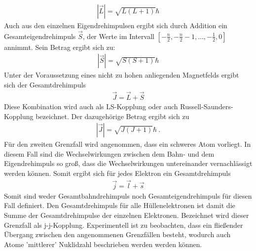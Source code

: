 \begin{align}
	|\vec{L}|=\sqrt{L(L+1)}\hbar
\end{align} 
Auch aus den einzelnen Eigendrehimpulsen ergibt sich durch Addition ein Gesamteigendrehimpuls $\vec{S}$, der Werte im Intervall $[-\frac{n}{2},-\frac{n}{2}-1,...,-\frac{1}{2},0]$ annimmt. Sein Betrag ergibt sich zu:
\begin{align}
	|\vec{S}|=\sqrt{S(S+1)}\hbar
\end{align} 
Unter der Voraussetzung eines nicht zu hohen anliegenden Magnetfelds ergibt sich der Gesamtdrehimpuls 
\begin{align}
	\vec{J}=\vec{L}+\vec{S}
\end{align}
Diese Kombination wird auch als LS-Kopplung oder auch Russell-Saunders-Kopplung bezeichnet.
Der dazugehörige Betrag ergibt sich zu
\begin{align}
	|\vec{J}|=\sqrt{J(J+1)}\hbar\:.
\end{align} 
Für den zweiten Grenzfall wird angenommen, dass ein schweres Atom vorliegt. In diesem Fall sind die Wechselwirkungen zwischen dem Bahn- und dem Eigendrehimpuls so groß, dass die Wechselwirkungen untereinander vernachlässigt werden können. Somit ergibt sich für jedes Elektron ein Gesamtdrehimpuls
\begin{align}
	\vec{j}=\vec{l}+\vec{s}
\end{align}
Somit sind weder Gesamtbahndrehimpuls noch Gesamteigendrehimpuls für diesen Fall definiert. Den Gesamtdrehimpuls für alle Hüllenelektronen ist damit die Summe der Gesamtdrehimpulse der einzelnen Elektronen. Bezeichnet wird dieser Grenzfall als j-j-Kopplung. Experimentell ist zu beobachten, dass ein fließender Übergang zwischen den angenommenen Grenzfällen besteht, wodurch auch Atome 'mittlerer' Nuklidzahl beschrieben werden werden können. 


